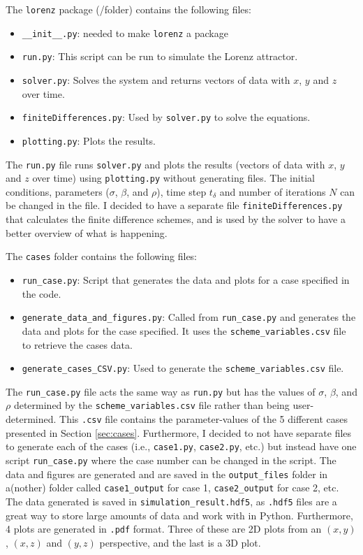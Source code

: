 \documentclass{article}
\def\td{t_\delta}
\def\code#1{\texttt{#1}}
\begin{document}
The \code{lorenz} package (/folder) contains the following files:
\begin{itemize}
    \item \code{\_\_init\_\_.py}: needed to make \code{lorenz} a package
    \item \code{run.py}: This script can be run to simulate the Lorenz attractor.  
    \item \code{solver.py}: Solves the system and returns vectors of data with $x$, $y$ and $z$ over time.
    \item \code{finiteDifferences.py}: Used by \code{solver.py} to solve the equations.  
    \item \code{plotting.py}: Plots the results. 
\end{itemize}
\vspace{1em}
The \code{run.py} file runs \code{solver.py} and plots the results (vectors of data with $x$, $y$ and $z$ over time) using \code{plotting.py} without generating files. The initial conditions, parameters ($\sigma$, $\beta$, and $\rho$), time step $\td$ and number of iterations $N$ can be changed in the file. I decided to have a separate file \code{finiteDifferences.py} that calculates the finite difference schemes, and is used by the solver to have a better overview of what is happening.

The \code{cases} folder contains the following files:
\begin{itemize}
    \item \code{run\_case.py}: Script that generates the data and plots for a case specified in the code.
    \item \code{generate\_data\_and\_figures.py}: Called from \code{run\_case.py} and generates the data and plots for the case specified. It uses the \code{scheme\_variables.csv} file to retrieve the cases data.
    \item \code{generate\_cases\_CSV.py}: Used to generate the \code{scheme\_variables.csv} file.
\end{itemize}
\vspace{1em}
The \code{run\_case.py} file acts the same way as \code{run.py} but has the values of $\sigma$, $\beta$, and $\rho$ determined by the \code{scheme\_variables.csv} file rather than being user-determined. This \code{.csv} file contains the parameter-values of the 5 different cases presented in Section \ref{sec:cases}. Furthermore, I decided to not have separate files to generate each of the cases (i.e., \code{case1.py}, \code{case2.py}, etc.) but instead have one script \code{run\_case.py} where the case number can be changed in the script. The data and figures are generated and are saved in the \code{output\_files} folder in a(nother) folder called \code{case1\_output} for case 1, \code{case2\_output} for case 2, etc. The data generated is saved in \code{simulation\_result.hdf5}, as \code{.hdf5} files are a great way to store large amounts of data and work with in Python. Furthermore, 4 plots are generated in \code{.pdf} format. Three of these are 2D plots from an $(x,y)$, $(x,z)$ and $(y,z)$ perspective, and the last is a 3D plot.  
\end{document}
